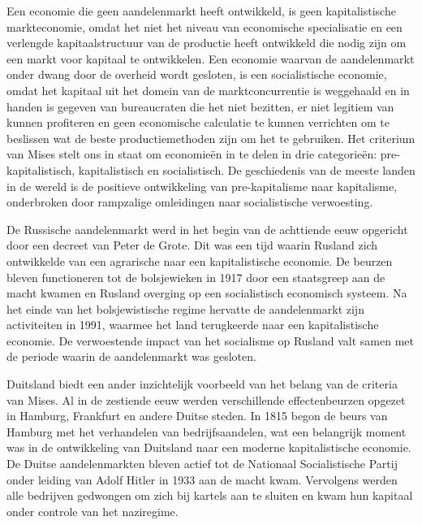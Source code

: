 Een economie die geen aandelenmarkt heeft ontwikkeld, is geen kapitalistische markteconomie, omdat het niet het niveau van economische specialisatie en een verlengde kapitaalstructuur van de productie heeft ontwikkeld die nodig zijn om een markt voor kapitaal te ontwikkelen. Een economie waarvan de aandelenmarkt onder dwang door de overheid wordt gesloten, is een socialistische economie, omdat het kapitaal uit het domein van de marktconcurrentie is weggehaald en in handen is gegeven van bureaucraten die het niet bezitten, er niet legitiem van kunnen profiteren en geen economische calculatie te kunnen verrichten om te beslissen wat de beste productiemethoden zijn om het te gebruiken. Het criterium van Mises stelt ons in staat om economieën in te delen in drie categorieën: pre-kapitalistisch, kapitalistisch en socialistisch. De geschiedenis van de meeste landen in de wereld is de positieve ontwikkeling van pre-kapitalisme naar kapitalisme, onderbroken door rampzalige omleidingen naar socialistische verwoesting.

De Russische aandelenmarkt werd in het begin van de achttiende eeuw opgericht door een decreet van Peter de Grote. Dit was een tijd waarin Rusland zich ontwikkelde van een agrarische naar een kapitalistische economie. De beurzen bleven functioneren tot de bolsjewieken in 1917 door een staatsgreep aan de macht kwamen en Rusland overging op een socialistisch economisch systeem. Na het einde van het bolsjewistische regime hervatte de aandelenmarkt zijn activiteiten in 1991, waarmee het land terugkeerde naar een kapitalistische economie. De verwoestende impact van het socialisme op Rusland valt samen met de periode waarin de aandelenmarkt was gesloten.

Duitsland biedt een ander inzichtelijk voorbeeld van het belang van de criteria van Mises. Al in de zestiende eeuw werden verschillende effectenbeurzen opgezet in Hamburg, Frankfurt en andere Duitse steden. In 1815 begon de beurs van Hamburg met het verhandelen van bedrijfsaandelen, wat een belangrijk moment was in de ontwikkeling van Duitsland naar een moderne kapitalistische economie. De Duitse aandelenmarkten bleven actief tot de Nationaal Socialistische Partij onder leiding van Adolf Hitler in 1933 aan de macht kwam. Vervolgens werden alle bedrijven gedwongen om zich bij kartels aan te sluiten en kwam hun kapitaal onder controle van het naziregime.

